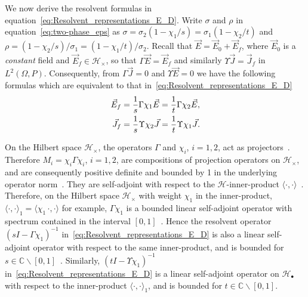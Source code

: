 \documentclass{cmslatex}
\begin{document}
We now derive the resolvent formulas in
equation~\eqref{eq:Resolvent_representations_E_D}. 
Write $\sigma$ and $\rho$ in 
equation~\eqref{eq:two-phase_eps} as $\sigma=\sigma_2(1-\chi_1/s)=\sigma_1(1-\chi_2/t)$ and
$\rho=(1-\chi_2/s)/\sigma_1=(1-\chi_1/t)/\sigma_2$. Recall that
$\vec{E}=\vec{E}_0+\vec{E}_f$, where $\vec{E}_0$ is a \emph{constant}
field and $\vec{E}_f\in\mathscr{H}_\times$, so that
$\Gamma\vec{E}=\vec{E}_f$ and similarly
$\Upsilon\vec{J}=\vec{J}_f$ in $L^2(\Omega,P)$. Consequently, from $\Gamma\vec{J}=0$
and $\Upsilon\vec{E}=0$ we have the following formulas which are equivalent
to that in~\eqref{eq:Resolvent_representations_E_D}   
% 
\begin{align}\label{eq:Proj_rep_Ef_Jf}
  \vec{E}_f&=\frac{1}{s}\Gamma\chi_1\vec{E}=\frac{1}{t}\Gamma\chi_2\vec{E}, \\
  \vec{J}_f&=\frac{1}{s}\Upsilon\chi_2\vec{J}=\frac{1}{t}\Upsilon\chi_1\vec{J}.\notag
\end{align}
%




On the Hilbert space $\mathscr{H}_\times$, the operators $\Gamma$ and $\chi_i$,
$i=1,2$, act as projectors~\cite{Golden:CMP-473}. Therefore 
$M_i=\chi_i\Gamma\chi_i$, $i=1,2$, are compositions of projection operators on
$\mathscr{H}_\times$, and are consequently positive definite and bounded by
1 in the underlying operator norm~\cite{Rudin:87,Stone:64}. They are
self-adjoint with respect to the $\mathscr{H}$-inner-product
$\langle\cdot,\cdot\rangle$~\cite{Golden:CMP-473}. Therefore, on the Hilbert space
$\mathscr{H}_\times$ 
with weight $\chi_1$ in the inner-product, $\langle\cdot,\cdot\rangle_1=\langle\chi_1\,\cdot,\cdot\rangle$ for
example, $\Gamma\chi_1$ is a bounded linear self-adjoint operator with
spectrum contained in the interval
$[0,1]$~\cite{Golden:CMP-473,Reed-1980,Stone:64}. Hence the resolvent 
operator $(sI-\Gamma\chi_1)^{-1}$ in~\eqref{eq:Resolvent_representations_E_D}
is also a linear self-adjoint operator with respect to the same
inner-product, and is bounded for
$s\in\mathbb{C}\backslash[0,1]$~\cite{Stone:64}. Similarly, $(tI-\Upsilon\chi_1)^{-1}$
in~\eqref{eq:Resolvent_representations_E_D} is a linear self-adjoint 
operator on $\mathscr{H}_\bullet$ with respect to the inner-product
$\langle\cdot,\cdot\rangle_1$, and is bounded for $t\in\mathbb{C}\backslash[0,1]$.
\end{document}
